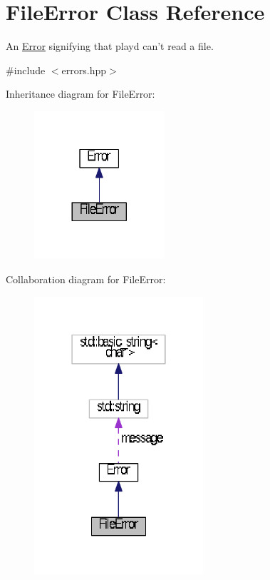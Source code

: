 \hypertarget{classFileError}{\section{File\+Error Class Reference}
\label{classFileError}
}


An \hyperlink{classError}{Error} signifying that playd can't read a file.  




{\ttfamily \#include $<$errors.\+hpp$>$}



Inheritance diagram for File\+Error\+:
\nopagebreak
\begin{figure}[H]
\begin{center}
\leavevmode
\includegraphics[width=137pt]{classFileError__inherit__graph}
\end{center}
\end{figure}


Collaboration diagram for File\+Error\+:
\nopagebreak
\begin{figure}[H]
\begin{center}
\leavevmode
\includegraphics[width=178pt]{classFileError__coll__graph}
\end{center}
\end{figure}
